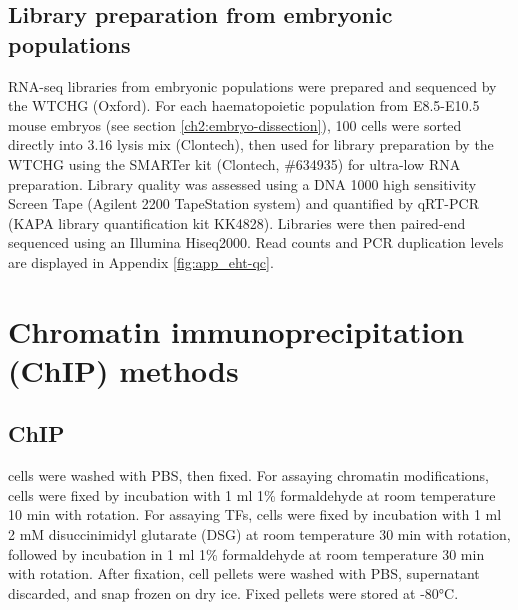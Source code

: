 \subsection{\label{ch2:rna-embryo}Library preparation from embryonic populations}

RNA-seq libraries from embryonic populations were prepared and sequenced by the WTCHG (Oxford). For each haematopoietic population from E8.5-E10.5 mouse embryos (see section \ref{ch2:embryo-dissection}), 100 cells were sorted directly into 3.16 \microl{} lysis mix (Clontech), then used for library preparation by the WTCHG using the SMARTer kit (Clontech, \#634935) for ultra-low RNA preparation. Library quality was assessed using a DNA 1000 high sensitivity Screen Tape (Agilent 2200 TapeStation system) and quantified by qRT-PCR (KAPA library quantification kit KK4828). Libraries were then paired-end sequenced using an Illumina Hiseq2000. Read counts and PCR duplication levels are displayed in Appendix \ref{fig:app_eht-qc}.

\section{Chromatin immunoprecipitation (ChIP) methods}

\subsection{\label{ch2:chip}ChIP}

 cells were washed with PBS, then fixed. For assaying chromatin modifications, cells were fixed by incubation with 1 ml 1\% formaldehyde at room temperature 10 min with rotation. For assaying TFs, cells were fixed by incubation with 1 ml 2 mM disuccinimidyl glutarate (DSG) at room temperature 30 min with rotation, followed by incubation in 1 ml 1\% formaldehyde at room temperature 30 min with rotation. After fixation, cell pellets were washed with PBS, supernatant discarded, and snap frozen on dry ice. Fixed pellets were stored at -80°C.

